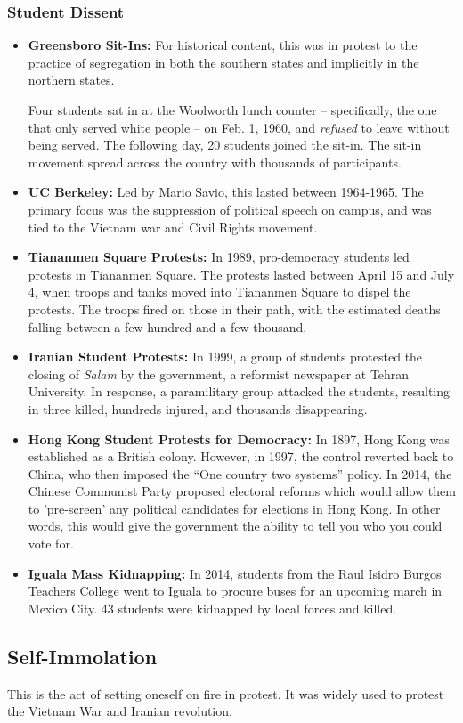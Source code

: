 \documentclass[letterpaper]{article}
\begin{document}
\subsubsection{Student Dissent}
\begin{itemize}
    \item \textbf{Greensboro Sit-Ins:} For historical content, this was in protest to the practice of segregation in both the southern states and implicitly in the northern states. 

    \bigskip 
    
    Four students sat in at the Woolworth lunch counter -- specifically, the one that only served white people -- on Feb. 1, 1960, and \emph{refused} to leave without being served. The following day, 20 students joined the sit-in. The sit-in movement spread across the country with thousands of participants. 

    \item \textbf{UC Berkeley:} Led by Mario Savio, this lasted between 1964-1965. The primary focus was the suppression of political speech on campus, and was tied to the Vietnam war and Civil Rights movement. 

    \item \textbf{Tiananmen Square Protests:} In 1989, pro-democracy students led protests in Tiananmen Square. The protests lasted between April 15 and July 4, when troops and tanks moved into Tiananmen Square to dispel the protests. The troops fired on those in their path, with the estimated deaths falling between a few hundred and a few thousand.

    \item \textbf{Iranian Student Protests:} In 1999, a group of students protested the closing of \emph{Salam} by the government, a reformist newspaper at Tehran University. In response, a paramilitary group attacked the students, resulting in three killed, hundreds injured, and thousands disappearing.

    \item \textbf{Hong Kong Student Protests for Democracy:} In 1897, Hong Kong was established as a British colony. However, in 1997, the control reverted back to China, who then imposed the ``One country two systems'' policy. In 2014, the Chinese Communist Party proposed electoral reforms which would allow them to 'pre-screen' any political candidates for elections in Hong Kong. In other words, this would give the government the ability to tell you who you could vote for.

    \item \textbf{Iguala Mass Kidnapping:} In 2014, students from the Raul Isidro Burgos Teachers College went to Iguala to procure buses for an upcoming march in Mexico City. 43 students were kidnapped by local forces and killed. 
\end{itemize}

\subsection{Self-Immolation}
This is the act of setting oneself on fire in protest. It was widely used to protest the Vietnam War and Iranian revolution.
\end{document}

